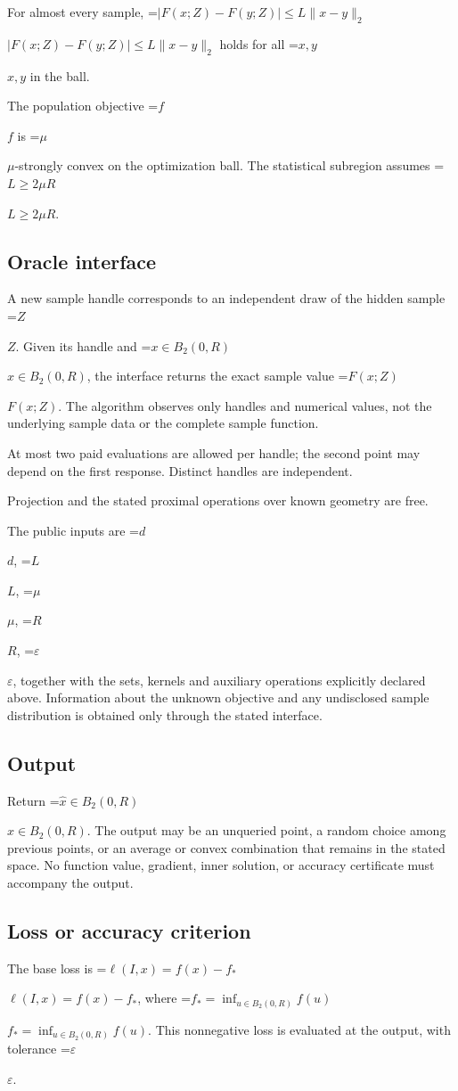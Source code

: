 \documentclass[10pt,a4paper]{article}
\newcommand{\AtlasMath}[1]{\par\begingroup\centering\setbox0=\hbox{$\displaystyle #1$}\ifdim\wd0>1.4\linewidth\typeout{ATLAS WIDE FORMULA: \the\wd0}\fi\ifdim\wd0>\linewidth\resizebox{\linewidth}{!}{\box0}\else\box0\fi\par\endgroup}
\newcommand{\AtlasInlineMath}[1]{\begingroup\setbox0=\hbox{$#1$}\ifdim\wd0>.4\linewidth\endgroup\AtlasMath{#1}\else\endgroup$#1$\fi}
\begin{document}
For almost every sample, \AtlasInlineMath{|F(x;Z)-F(y;Z)|\le L\|x-y\|_2} holds for all \AtlasInlineMath{x,y} in the ball.

The population objective \AtlasInlineMath{f} is \AtlasInlineMath{\mu}-strongly convex on the optimization ball. The statistical subregion assumes \AtlasInlineMath{L\ge2\mu R}.

\subsection{Oracle interface}
A new sample handle corresponds to an independent draw of the hidden sample \AtlasInlineMath{Z}. Given its handle and \AtlasInlineMath{x\in B_2(0,R)}, the interface returns the exact sample value \AtlasInlineMath{F(x;Z)}. The algorithm observes only handles and numerical values, not the underlying sample data or the complete sample function.

At most two paid evaluations are allowed per handle; the second point may depend on the first response. Distinct handles are independent.

Projection and the stated proximal operations over known geometry are free.

The public inputs are \AtlasInlineMath{d}, \AtlasInlineMath{L}, \AtlasInlineMath{\mu}, \AtlasInlineMath{R}, \AtlasInlineMath{\varepsilon}, together with the sets, kernels and auxiliary operations explicitly declared above. Information about the unknown objective and any undisclosed sample distribution is obtained only through the stated interface.

\subsection{Output}
Return \AtlasInlineMath{\widehat{x}\in B_2(0,R)}. The output may be an unqueried point, a random choice among previous points, or an average or convex combination that remains in the stated space. No function value, gradient, inner solution, or accuracy certificate must accompany the output.

\subsection{Loss or accuracy criterion}
The base loss is \AtlasInlineMath{\ell(I,x)=f(x)-f_*}, where \AtlasInlineMath{f_*=\inf_{u\in B_2(0,R)}f(u)}. This nonnegative loss is evaluated at the output, with tolerance \AtlasInlineMath{\varepsilon}.
\end{document}
